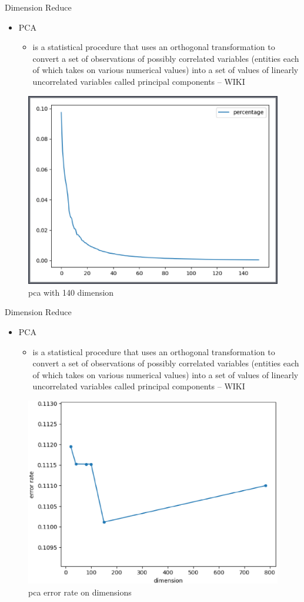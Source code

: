 \documentclass[
 size=12pt,
 paper=smartboard, %
 mode=present, %
 display=slides, %
style=tuliplab,
pauseslide,
fleqn,leqno]{powerdot}
\begin{document}
\begin{slide}{Dimension Reduce}
  \begin{itemize}
    \item PCA
    \begin{itemize}
      \item is a statistical procedure that uses an orthogonal transformation to
      convert a set of observations of possibly correlated variables (entities 
      each of which takes on various numerical values) into a set of values of
      linearly uncorrelated variables called principal components -- WIKI
    \end{itemize}
  \end{itemize}
  \begin{figure}[h]
    \centering
    \includegraphics[width=0.5\linewidth]{figures/pca-140.eps}
    \caption{pca with 140 dimension}
    \label{fig:pca140}
  \end{figure}
\end{slide}

\begin{slide}{Dimension Reduce}
  \begin{itemize}
    \item PCA
    \begin{itemize}
      \item is a statistical procedure that uses an orthogonal transformation to
      convert a set of observations of possibly correlated variables (entities 
      each of which takes on various numerical values) into a set of values of
      linearly uncorrelated variables called principal components -- WIKI
    \end{itemize}
  \end{itemize}
  \begin{figure}[h]
    \centering
    \includegraphics[width=0.5\linewidth]{figures/pca-de.eps}
    \caption{pca error rate on dimensions}
    \label{fig:pcade}
  \end{figure}
\end{slide}
\end{document}
